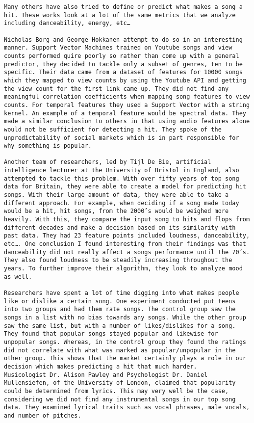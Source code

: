\documentclass[11pt]{article}
\begin{document}
\begin{verbatim}
Many others have also tried to define or predict what makes a song a hit. These works look at a lot of the same metrics that we analyze including danceability, energy, etc…

Nicholas Borg and George Hokkanen attempt to do so in an interesting manner. Support Vector Machines trained on Youtube songs and view counts performed quire poorly so rather than come up with a general predictor, they decided to tackle only a subset of genres, ten to be specific. Their data came from a dataset of features for 10000 songs which they mapped to view counts by using the Youtube API and getting the view count for the first link came up. They did not find any meaningful correlation coefficients when mapping song features to view counts. For temporal features they used a Support Vector with a string kernel. An example of a temporal feature would be spectral data. They made a similar conclusion to others in that using audio features alone would not be sufficient for detecting a hit. They spoke of the unpredictability of social markets which is in part responsible for why something is popular.

Another team of researchers, led by Tijl De Bie, artificial intelligence lecturer at the University of Bristol in England, also attempted to tackle this problem. With over fifty years of top song data for Britain, they were able to create a model for predicting hit songs. With their large amount of data, they were able to take a different approach. For example, when deciding if a song made today would be a hit, hit songs, from the 2000’s would be weighed more heavily. With this, they compare the input song to hits and flops from different decades and make a decision based on its similarity with past data. They had 23 feature points included loudness, danceability, etc…. One conclusion I found interesting from their findings was that danceability did not really affect a songs performance until the 70’s. They also found loudness to be steadily increasing throughout the years. To further improve their algorithm, they look to analyze mood as well.

Researchers have spent a lot of time digging into what makes people like or dislike a certain song. One experiment conducted put teens into two groups and had them rate songs. The control group saw the songs in a list with no bias towards any songs. While the other group saw the same list, but with a number of likes/dislikes for a song. They found that popular songs stayed popular and likewise for unpopular songs. Whereas, in the control group they found the ratings did not correlate with what was marked as popular/unpopular in the other group. This shows that the market certainly plays a role in our decision which makes predicting a hit that much harder.
Musicologist Dr. Alison Pawley and Psychologist Dr. Daniel Mullensiefen, of the University of London, claimed that popularity could be determined from lyrics. This may very well be the case, considering we did not find any instrumental songs in our top song data. They examined lyrical traits such as vocal phrases, male vocals, and number of pitches.


\end{verbatim}
\end{document}
